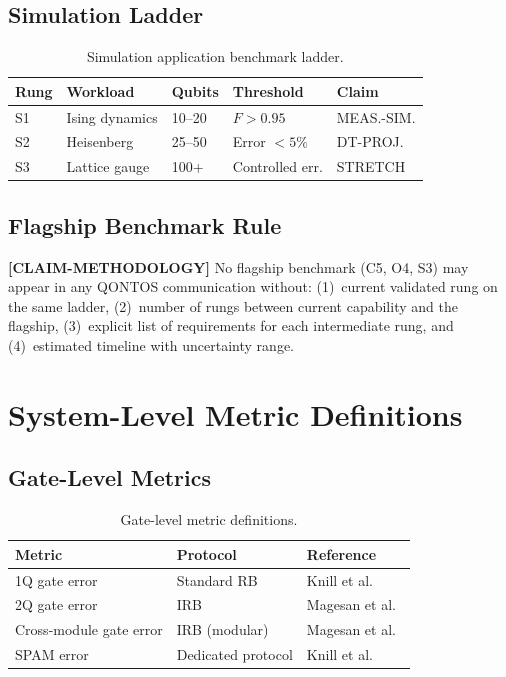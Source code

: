 \documentclass[conference]{IEEEtran}
\begin{document}
\subsection{Simulation Ladder}

\begin{table}[H]
\centering
\caption{Simulation application benchmark ladder.}
\label{tab:sim_ladder}
\begin{tabular}{@{}l l l l l@{}}
\toprule
\textbf{Rung} & \textbf{Workload} & \textbf{Qubits} & \textbf{Threshold} & \textbf{Claim} \\
\midrule
S1 & Ising dynamics & 10--20 & $F > 0.95$ & MEAS.-SIM. \\
S2 & Heisenberg & 25--50 & Error $< 5\%$ & DT-PROJ. \\
S3 & Lattice gauge & 100+ & Controlled err. & STRETCH \\
\bottomrule
\end{tabular}
\end{table}

\subsection{Flagship Benchmark Rule}

\textbf{[CLAIM-METHODOLOGY]} No flagship benchmark (C5, O4, S3) may appear in any QONTOS communication without: (1)~current validated rung on the same ladder, (2)~number of rungs between current capability and the flagship, (3)~explicit list of requirements for each intermediate rung, and (4)~estimated timeline with uncertainty range.

\section{System-Level Metric Definitions}

\subsection{Gate-Level Metrics}

\begin{table}[H]
\centering
\caption{Gate-level metric definitions.}
\begin{tabular}{@{}l l l@{}}
\toprule
\textbf{Metric} & \textbf{Protocol} & \textbf{Reference} \\
\midrule
1Q gate error & Standard RB & Knill et al.~\cite{knill2008} \\
2Q gate error & IRB & Magesan et al.~\cite{magesan2012} \\
Cross-module gate error & IRB (modular) & Magesan et al.~\cite{magesan2012} \\
SPAM error & Dedicated protocol & Knill et al.~\cite{knill2008} \\
\bottomrule
\end{tabular}
\end{table}
\end{document}
